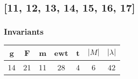 \documentclass[a4paper]{article}
\begin{document}
\newpage\subsection{[11, 12, 13, 14, 15, 16, 17]}
\noindent\begin{minipage}{0.6\textwidth}
\subsubsection*{Invariants}
\centering
\begin{tabular}{|c|c|c|c|c|c|c|}
\toprule
g & F & m & ewt & t & \(|M|\) & \(|\lambda|\) \\
\midrule
14 & 21 & 11 & 28 & 4 & 6 & 42 \\
\bottomrule
\end{tabular}
\end{minipage}%
\end{document}

